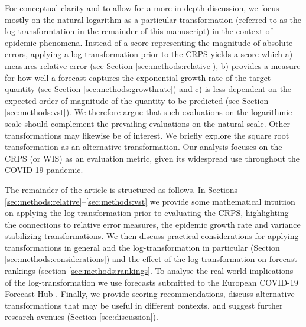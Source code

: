 \documentclass{article}
\begin{document}
For conceptual clarity and to allow for a more in-depth discussion, we focus mostly on the natural logarithm as a particular transformation (referred to as the log-transformtation in the remainder of this manuscript) in the context of epidemic phenomena. Instead of a score representing the magnitude of absolute errors, applying a log-transformation prior to the CRPS yields a score which a) measures relative error (see Section \ref{sec:methods:relative}), b) provides a measure for how well a forecast captures the exponential growth rate of the target quantity (see Section \ref{sec:methods:growthrate}) and c) is less dependent on the expected order of magnitude of the quantity to be predicted (see Section \ref{sec:methods:vst}). %
We therefore argue that such evaluations on the logarithmic scale should complement the prevailing evaluations on the natural scale. 
Other transformations may likewise be of interest. We briefly explore the square root transformation as an alternative transformation. %
Our analysis focuses on the CRPS (or WIS) as an evaluation metric, given its widespread use throughout the COVID-19 pandemic. 

The remainder of the article is structured as follows. In Sections \ref{sec:methods:relative}--\ref{sec:methods:vst} we provide some mathematical intuition on applying the log-transformation prior to evaluating the CRPS, highlighting the connections to relative error measures, the epidemic growth rate and variance stabilizing transformations.
We then discuss practical considerations for applying transformations in general and the log-transformation in particular (Section \ref{sec:methods:considerations}) and the effect of the log-transformation on forecast rankings (section \ref{sec:methods:rankings}. To analyse the real-world implications of the log-transformation we use forecasts submitted to the European COVID-19 Forecast Hub  \citep{europeancovid-19forecasthubEuropeanCovid19Forecast2021, sherrattPredictivePerformanceMultimodel2022}. Finally, we provide scoring recommendations, discuss alternative transformations that may be useful in different contexts, and suggest further research avenues (Section \ref{sec:discussion}). 
\end{document}
